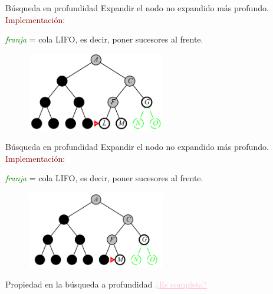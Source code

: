 \documentclass{beamer}
\theoremstyle{definition}
\theoremstyle{theorem}
\theoremstyle{remark}
\begin{document}
\begin{frame}{Búsqueda en profundidad}
Expandir el nodo no expandido más profundo.\\
\textcolor{DarkRed}{Implementación:}
\begin{center}
    \textit{\textcolor{Green}{franja}} = cola LIFO, es decir, poner sucesores al
    frente.\\
\end{center}
\begin{figure}
    \centering
    \includegraphics[width = 60mm, scale = 0.7]{53_image.PNG}
\end{figure}
\end{frame}{}

\begin{frame}{Búsqueda en profundidad}
Expandir el nodo no expandido más profundo.\\
\textcolor{DarkRed}{Implementación:}
\begin{center}
    \textit{\textcolor{Green}{franja}} = cola LIFO, es decir, poner sucesores al
    frente.\\
\end{center}
\begin{figure}
    \centering
    \includegraphics[width = 60mm, scale = 0.7]{54_image.PNG}
\end{figure}
\end{frame}{}


\begin{frame}{Propiedad en la búsqueda a profundidad}
\textcolor{pink}{\underline{¿Es completa?}}
\end{frame}
\end{document}
